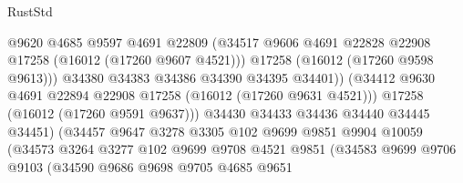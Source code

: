 \begin{lexlean}{RustStd}
\begin{coremodule}
                                      @9620
                                      @4685
                                      @9597
                                      @4691
                                      @22809
                                      (@34517
                                        @9606
                                        @4691
                                        @22828
                                        @22908
                                        @17258
                                        (@16012 (@17260 @9607 @4521)))
                                      @17258
                                      (@16012 (@17260 @9598 @9613)))
                                    @34380
                                    @34383
                                    @34386
                                    @34390
                                    @34395
                                    @34401))
                                (@34412
                                  @9630
                                  @4691
                                  @22894
                                  @22908
                                  @17258
                                  (@16012 (@17260 @9631 @4521)))
                                @17258
                                (@16012 (@17260 @9591 @9637)))
                              @34430
                              @34433
                              @34436
                              @34440
                              @34445
                              @34451)
                            (@34457
                              @9647
                              @3278
                              @3305
                              @102
                              @9699
                              @9851
                              @9904
                              @10059
                              (@34573
                                @3264
                                @3277
                                @102
                                @9699
                                @9708
                                @4521
                                @9851
                                (@34583
                                  @9699
                                  @9706
                                  @9103
                                  (@34590
                                    @9686
                                    @9698
                                    @9705
                                    @4685
                                    @9651

\end{coremodule}
\end{lexlean}

